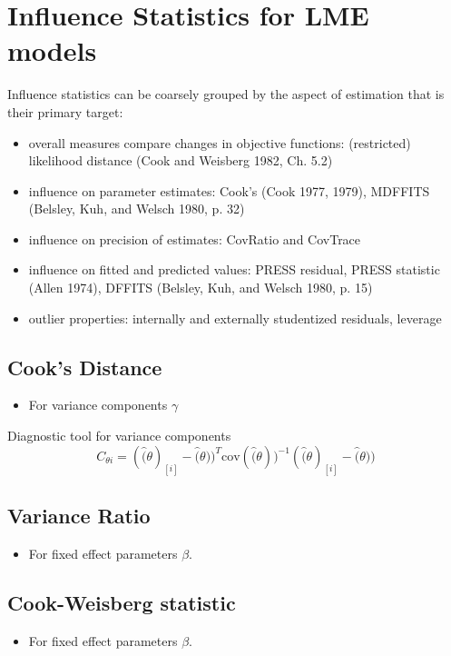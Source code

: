 \documentclass[Main.tex]{subfiles}
\begin{document}
		
			\section{Influence Statistics for LME models} %
			Influence statistics can be coarsely grouped by the aspect of estimation that is their primary target:
			\begin{itemize}
				\item overall measures compare changes in objective functions: (restricted) likelihood distance (Cook and Weisberg 1982, Ch. 5.2)
				\item influence on parameter estimates: Cook's  (Cook 1977, 1979), MDFFITS (Belsley, Kuh, and Welsch 1980, p. 32)
				\item influence on precision of estimates: CovRatio and CovTrace
				\item influence on fitted and predicted values: PRESS residual, PRESS statistic (Allen 1974), DFFITS (Belsley, Kuh, and Welsch 1980, p. 15)
				\item outlier properties: internally and externally studentized residuals, leverage
			\end{itemize}


	
	\subsection{Cook's Distance} %
	\begin{itemize}
		\item For variance components $\gamma$
	\end{itemize}
	
	Diagnostic tool for variance components
	\[ C_{\theta i} =(\hat(\theta)_{[i]} - \hat(\theta))^{T}\mbox{cov}( \hat(\theta))^{-1}(\hat(\theta)_{[i]} - \hat(\theta))\]
	
\subsection{Variance Ratio} %
\begin{itemize}
	\item For fixed effect parameters $\beta$.
\end{itemize}

	
	\subsection{Cook-Weisberg statistic} %
	\begin{itemize}
		\item For fixed effect parameters $\beta$.
	\end{itemize}
\end{document}
